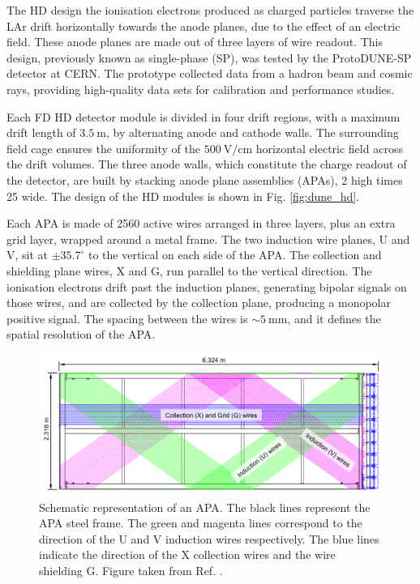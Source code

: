 The HD design the ionisation electrons produced as charged particles traverse the LAr drift horizontally towards the anode planes, due to the effect of an electric field. These anode planes are made out of three layers of wire readout. This design, previously known as single-phase (SP), was tested by the ProtoDUNE-SP detector at CERN. The prototype collected data from a hadron beam and cosmic rays, providing high-quality data sets for calibration and performance studies.

Each FD HD detector module is divided in four drift regions, with a maximum drift length of $3.5~\mathrm{m}$, by alternating anode and cathode walls. The surrounding field cage ensures the uniformity of the $500~\mathrm{V/cm}$ horizontal electric field across the drift volumes. The three anode walls, which constitute the charge readout of the detector, are built by stacking anode plane assemblies (APAs), 2 high times 25 wide. The design of the HD modules is shown in Fig. \ref{fig:dune_hd}.

Each APA is made of 2560 active wires arranged in three layers, plus an extra grid layer, wrapped around a metal frame. The two induction wire planes, U and V, sit at $\pm 35.7^{\circ}$ to the vertical on each side of the APA. The collection and shielding plane wires, X and G, run parallel to the vertical direction. The ionisation electrons drift past the induction planes, generating bipolar signals on those wires, and are collected by the collection plane, producing a monopolar positive signal. The spacing between the wires is $\sim 5~\mathrm{mm}$, and it defines the spatial resolution of the APA.

\begin{figure}[t]
	\centering
	\includegraphics[width=1\linewidth]{Images/DUNE/FD/APA_wires}
	\caption[Schematic representation of an APA frames showing the U, V, X and G wires.]{Schematic representation of an APA. The black lines represent the APA steel frame. The green and magenta lines correspond to the direction of the U and V induction wires respectively. The blue lines indicate the direction of the X collection wires and the wire shielding G. Figure taken from Ref. \cite{DUNE2020TDR1}.}
	\label{fig:apa}
\end{figure}

